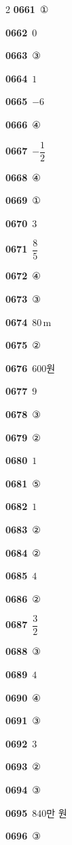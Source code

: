 \documentclass[10pt,a4paper]{article}
\begin{document}
\begin{multicols}{2}
\noindent\textbf{0661}\ ①\par
\noindent\textbf{0662}\ $0$\par
\noindent\textbf{0663}\ ③\par
\noindent\textbf{0664}\ $1$\par
\noindent\textbf{0665}\ $-6$\par
\noindent\textbf{0666}\ ④\par
\noindent\textbf{0667}\ $-\dfrac{1}{2}$\par
\noindent\textbf{0668}\ ④\par
\noindent\textbf{0669}\ ①\par
\noindent\textbf{0670}\ $3$\par
\noindent\textbf{0671}\ $\dfrac{8}{5}$\par
\noindent\textbf{0672}\ ④\par
\noindent\textbf{0673}\ ③\par
\noindent\textbf{0674}\ $80\,\mathrm{m}$\par
\noindent\textbf{0675}\ ②\par
\noindent\textbf{0676}\ $600$원\par
\noindent\textbf{0677}\ $9$\par
\noindent\textbf{0678}\ ③\par
\noindent\textbf{0679}\ ②\par
\noindent\textbf{0680}\ $1$\par
\noindent\textbf{0681}\ ⑤\par
\noindent\textbf{0682}\ $1$\par
\noindent\textbf{0683}\ ②\par
\noindent\textbf{0684}\ ②\par
\noindent\textbf{0685}\ $4$\par
\noindent\textbf{0686}\ ②\par
\noindent\textbf{0687}\ $\dfrac{3}{2}$\par
\noindent\textbf{0688}\ ③\par
\noindent\textbf{0689}\ $4$\par
\noindent\textbf{0690}\ ④\par
\noindent\textbf{0691}\ ③\par
\noindent\textbf{0692}\ $3$\par
\noindent\textbf{0693}\ ②\par
\noindent\textbf{0694}\ ③\par
\noindent\textbf{0695}\ $840$만 원\par
\noindent\textbf{0696}\ ③\par

\end{multicols}
\end{document}
